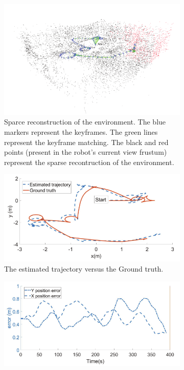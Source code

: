 \begin{figure}[H]
    \centering
    \begin{subfigure}[t]{0.8\linewidth}
        \centering
        \includegraphics[width=\linewidth]{assets/2_22_a.png}
        \caption{{Sparce reconstruction of the environment. The blue markers represent the keyframes. The green lines represent the keyframe matching. The black and red points (present in the robot's current view frustum) represent the sparse recontruction of the environment.}}
        \label{fig:2.22a}
    \end{subfigure}
    \begin{subfigure}[t]{0.8\linewidth}
        \centering
        \includegraphics[width=\linewidth]{assets/2_22_b.png}
        \caption{{The estimated trajectory versus the Ground truth.}}
        \label{fig:2.22b}
    \end{subfigure}
    \begin{subfigure}[t]{0.8\linewidth}
        \centering
        \includegraphics[width=\linewidth]{assets/2_22_c.png}

\end{subfigure}
\end{figure}
